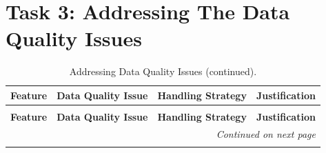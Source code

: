\documentclass[11pt]{report}
\begin{document}
\section*{Task 3: Addressing The Data Quality Issues}

\begin{longtable}{p{2cm}p{3cm}p{4cm}p{6cm}}

\caption{Addressing Data Quality Issues.}
\label{tab:address_data_quality_issues} \\
\toprule
\textbf{Feature} & \textbf{Data Quality Issue} & \textbf{Handling Strategy} & \textbf{Justification} \\
\midrule
\endfirsthead

\caption[]{Addressing Data Quality Issues (continued).} \\
\toprule
\textbf{Feature} & \textbf{Data Quality Issue} & \textbf{Handling Strategy} & \textbf{Justification} \\
\midrule
\endhead

\multicolumn{4}{r}{\textit{Continued on next page}} \\
\endfoot

\bottomrule
\endlastfoot


\end{longtable}
\end{document}
